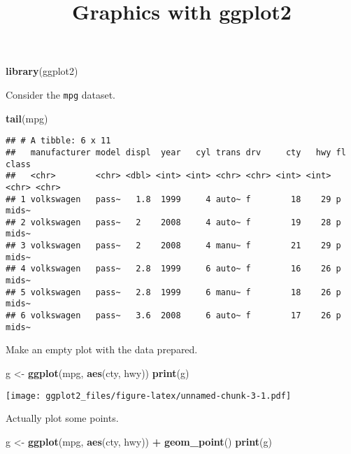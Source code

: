\documentclass[]{article}
\title{Graphics with ggplot2}
\author{}
\date{}
\newenvironment{Shaded}{\begin{snugshade}}{\end{snugshade}}
\newcommand{\KeywordTok}[1]{\textcolor[rgb]{0.13,0.29,0.53}{\textbf{#1}}}
\newcommand{\StringTok}[1]{\textcolor[rgb]{0.31,0.60,0.02}{#1}}
\newcommand{\OperatorTok}[1]{\textcolor[rgb]{0.81,0.36,0.00}{\textbf{#1}}}
\newcommand{\NormalTok}[1]{#1}
\begin{document}
\maketitle

\begin{Shaded}
\begin{Highlighting}[]
\KeywordTok{library}\NormalTok{(ggplot2)}
\end{Highlighting}
\end{Shaded}

Consider the \texttt{mpg} dataset.

\begin{Shaded}
\begin{Highlighting}[]
\KeywordTok{tail}\NormalTok{(mpg)}
\end{Highlighting}
\end{Shaded}

\begin{verbatim}
## # A tibble: 6 x 11
##   manufacturer model displ  year   cyl trans drv     cty   hwy fl    class
##   <chr>        <chr> <dbl> <int> <int> <chr> <chr> <int> <int> <chr> <chr>
## 1 volkswagen   pass~   1.8  1999     4 auto~ f        18    29 p     mids~
## 2 volkswagen   pass~   2    2008     4 auto~ f        19    28 p     mids~
## 3 volkswagen   pass~   2    2008     4 manu~ f        21    29 p     mids~
## 4 volkswagen   pass~   2.8  1999     6 auto~ f        16    26 p     mids~
## 5 volkswagen   pass~   2.8  1999     6 manu~ f        18    26 p     mids~
## 6 volkswagen   pass~   3.6  2008     6 auto~ f        17    26 p     mids~
\end{verbatim}

Make an empty plot with the data prepared.

\begin{Shaded}
\begin{Highlighting}[]
\NormalTok{g <-}\StringTok{ }\KeywordTok{ggplot}\NormalTok{(mpg, }\KeywordTok{aes}\NormalTok{(cty, hwy))}
\KeywordTok{print}\NormalTok{(g)}
\end{Highlighting}
\end{Shaded}

\texttt{[image: ggplot2\_files/figure-latex/unnamed-chunk-3-1.pdf]}

Actually plot some points.

\begin{Shaded}
\begin{Highlighting}[]
\NormalTok{g <-}\StringTok{ }\KeywordTok{ggplot}\NormalTok{(mpg, }\KeywordTok{aes}\NormalTok{(cty, hwy)) }\OperatorTok{+}
\StringTok{    }\KeywordTok{geom_point}\NormalTok{()}
\KeywordTok{print}\NormalTok{(g)}
\end{Highlighting}
\end{Shaded}
\end{document}
